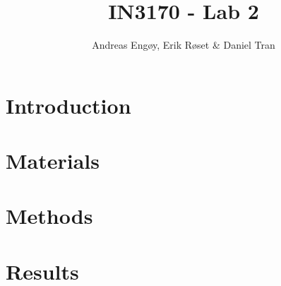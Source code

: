 \documentclass[twocolumn]{article}
\title{IN3170 - Lab 2}
\author{Andreas Engøy, Erik Røset \& Daniel Tran}
\date{\monthname[\the\month] \the\year}
\begin{document}
\maketitle

\section*{Introduction}
\section*{Materials}
\section*{Methods}
\section*{Results}
\end{document}
